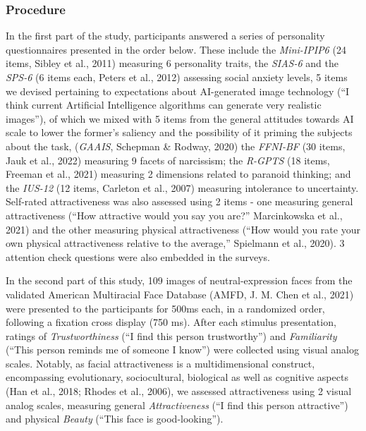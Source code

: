 \documentclass[
  man,floatsintext]{apa6}
\begin{document}
\hypertarget{procedure}{%
\subsubsection{Procedure}\label{procedure}}

In the first part of the study, participants answered a series of personality questionnaires presented in the order below. These include the \emph{Mini-IPIP6}
(24 items, Sibley et al., 2011)
measuring 6 personality traits, the \emph{SIAS-6} and the \emph{SPS-6}
(6 items each, Peters et al., 2012)
assessing social anxiety levels, 5 items we devised pertaining to expectations about AI-generated image technology (``I think current Artificial Intelligence algorithms can generate very realistic images''), of which we mixed with 5 items from the general attitudes towards AI scale to lower the former's saliency and the possibility of it priming the subjects about the task,
(\emph{GAAIS}, Schepman \& Rodway, 2020)
the \emph{FFNI-BF}
(30 items, Jauk et al., 2022)
measuring 9 facets of narcissism; the \emph{R-GPTS}
(18 items, Freeman et al., 2021)
measuring 2 dimensions related to paranoid thinking; and the \emph{IUS-12}
(12 items, Carleton et al., 2007)
measuring intolerance to uncertainty. Self-rated attractiveness was also assessed using 2 items - one measuring general attractiveness
(``How attractive would you say you are?'' Marcinkowska et al., 2021)
and the other measuring physical attractiveness
(``How would you rate your own physical attractiveness relative to the average,'' Spielmann et al., 2020).
3 attention check questions were also embedded in the surveys.

In the second part of this study, 109 images of neutral-expression faces from the validated American Multiracial Face Database
(AMFD, J. M. Chen et al., 2021)
were presented to the participants for 500ms each, in a randomized order, following a fixation cross display (750 ms). After each stimulus presentation, ratings of \emph{Trustworthiness} (``I find this person trustworthy'') and \emph{Familiarity} (``This person reminds me of someone I know'') were collected using visual analog scales. Notably, as facial attractiveness is a multidimensional construct, encompassing evolutionary, sociocultural, biological as well as cognitive aspects (Han et al., 2018; Rhodes et al., 2006), we assessed attractiveness using 2 visual analog scales, measuring general \emph{Attractiveness} (``I find this person attractive'') and physical \emph{Beauty} (``This face is good-looking'').
\end{document}
